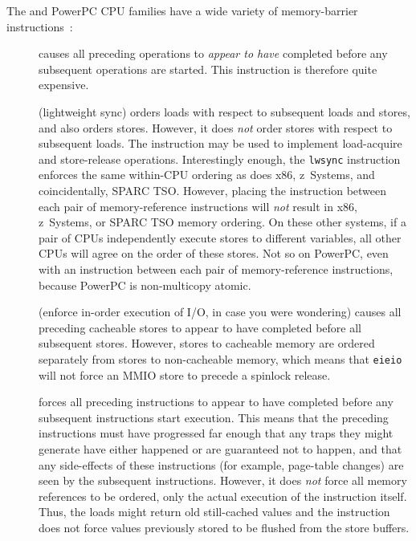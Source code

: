 The \Power{} and PowerPC CPU families have a wide variety of memory-barrier
instructions~\cite{PowerPC94,MichaelLyons05a}:
\begin{description}
\item	[] causes all preceding operations to {\em appear to have}
	completed before any subsequent operations are started.
	This instruction is therefore quite expensive.
\item	[] (lightweight sync) orders loads with respect to
	subsequent loads and stores, and also orders stores.
	However, it does {\em not} order stores with respect to subsequent
	loads.
	The  instruction may be used to implement
	load-acquire and store-release operations.
	Interestingly enough, the {\tt lwsync} instruction enforces
	the same within-CPU ordering as does x86, z~Systems, and coincidentally,
	SPARC TSO\@.
	However, placing the  instruction between each
	pair of memory-reference instructions will \emph{not}
	result in x86, z~Systems, or SPARC TSO memory ordering.
	On these other systems, if a pair of CPUs independently execute
	stores to different variables, all other CPUs will agree on the
	order of these stores.
	Not so on PowerPC, even with an  instruction between each
	pair of memory-reference instructions, because PowerPC is
	non-multicopy atomic.
\item	[] (enforce in-order execution of I/O, in case you
	were wondering) causes all preceding cacheable stores to appear
	to have completed before all subsequent stores.
	However, stores to cacheable memory are ordered separately from
	stores to non-cacheable memory, which means that {\tt eieio}
	will not force an MMIO store to precede a spinlock release.
\item	[] forces all preceding instructions to appear to have
	completed before any subsequent instructions start execution.
	This means that the preceding instructions must have progressed
	far enough that any traps they might generate have either happened
	or are guaranteed not to happen, and that any side-effects of
	these instructions (for example, page-table changes) are seen by the
	subsequent instructions.
	However, it does \emph{not} force all memory references to be
	ordered, only the actual execution of the instruction itself.
	Thus, the loads might return old still-cached values and the
	 instruction does not force values previously stored
	to be flushed from the store buffers.
\end{description}

